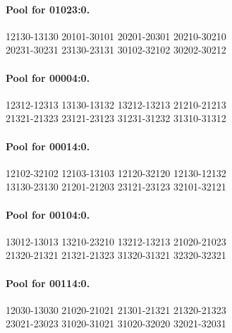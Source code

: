 \documentclass[11pt]{article}
\theoremstyle{remark}
\numberwithin{equation}{section}
\numberwithin{table}{section}
\begin{document}
\paragraph{Pool for 01023:0.}
\begingroup\footnotesize\ttfamily\begin{flushleft}
12130-13130 20101-30101 20201-20301 20210-30210\\
20231-30231 23130-23131 30102-32102 30202-30212\\
\end{flushleft}\endgroup
\paragraph{Pool for 00004:0.}
\begingroup\footnotesize\ttfamily\begin{flushleft}
12312-12313 13130-13132 13212-13213 21210-21213\\
21321-21323 23121-23123 31231-31232 31310-31312\\
\end{flushleft}\endgroup
\paragraph{Pool for 00014:0.}
\begingroup\footnotesize\ttfamily\begin{flushleft}
12102-32102 12103-13103 12120-32120 12130-12132\\
13130-23130 21201-21203 23121-23123 32101-32121\\
\end{flushleft}\endgroup
\paragraph{Pool for 00104:0.}
\begingroup\footnotesize\ttfamily\begin{flushleft}
13012-13013 13210-23210 13212-13213 21020-21023\\
21320-21321 21321-21323 31320-31321 32320-32321\\
\end{flushleft}\endgroup
\paragraph{Pool for 00114:0.}
\begingroup\footnotesize\ttfamily\begin{flushleft}
12030-13030 21020-21021 21301-21321 21320-21323\\
23021-23023 31020-31021 31020-32020 32021-32031\\
\end{flushleft}\endgroup
\end{document}
